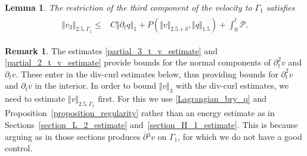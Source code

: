 \documentclass[10pt,reqno]{amsart}
\theoremstyle{plain}
\newtheorem{lemma}[theorem]{Lemma}
\theoremstyle{definition}
\newtheorem{remark}[theorem]{Remark}
\numberwithin{equation}{section}
\newcommand{\ccP}{\mathscr{P}}
\newcommand{\Ga}{\Gamma}
\newcommand{\de}{\delta}
\newcommand{\norm}[1]{\Vert#1\Vert}
\begin{document}
\begin{lemma}
\label{L03}
The restriction of the third component of the velocity 
to $\Gamma_1$
satisfies
\begin{align}
\begin{split}
\norm{ v_ 3}_{2.5,\Ga_1} 
\leq &
C \norm{\partial_t q}_1 + P(\norm{v}_{2.5+\de}, \norm{q}_{1.5} ) 
+ \int_{0}^{t} \ccP.
\end{split}
\label{estimate_v_2.5_boundary}
\end{align} 
\end{lemma}



\begin{remark}
The estimates \eqref{partial_3_t_v_estimate} and  \eqref{partial_2_t_v_estimate} 
provide bounds for the normal components of $\partial^2_t v$ and $\partial_t v$. These enter in the div-curl estimates
below, thus providing bounds for  $\partial^2_t v$ and $\partial_t v$
in the interior. In order to bound $\norm{v}_3$ with the div-curl
estimates, we need to estimate $\norm{v}_{2.5,\Ga_1}$ first. For this we use \eqref{Lagrangian_bry_q} and Proposition~\ref{proposition_regularity}
rather than an energy estimate as in 
Sections~\ref{section_L_2_estimate}
and~\ref{section_H_1_estimate}. This is because
arguing as in those sections produces 
$\overline{\partial}{}^3 v$ on $\Ga_1$, for which we do not have 
a good control.
\end{remark}
\end{document}
